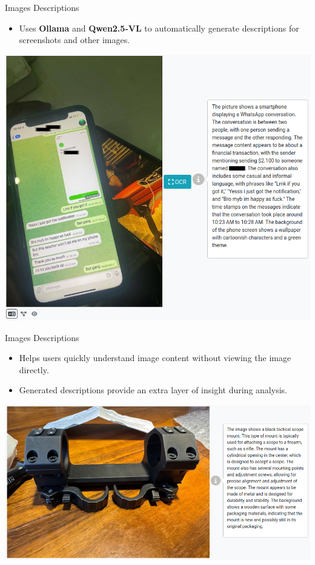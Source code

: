 \documentclass[10pt,aspectratio=169, colorlinks=true, linkcolor=circlBlue]{beamer}
\begin{document}
\begin{frame}[fragile]{Images Descriptions}
    \begin{itemize}
        \item Uses \textbf{Ollama} and \textbf{Qwen2.5-VL} to automatically generate descriptions for screenshots and other images.
    \end{itemize}
    \begin{center}
        \includegraphics[scale=0.25]{images/image-description-phone.png}
    \end{center}
\end{frame}

\begin{frame}[fragile]{Images Descriptions}
    \begin{itemize}
    	\item Helps users quickly understand image content without viewing the image directly.
        \item Generated descriptions provide an extra layer of insight during analysis.
    \end{itemize}
    \begin{center}
        \includegraphics[scale=0.32]{images/image-description-mount.png}
    \end{center}
\end{frame}
\end{document}
